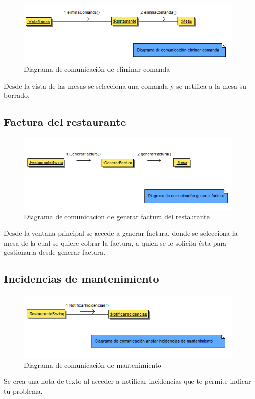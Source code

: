 \documentclass[spanish,a4paper,11pt, twoside]{report}	%
\begin{document}
		\begin{figure}[!h]
		\centering
		\includegraphics[scale=0.65]{DCeliminarcomanda.png}
		\caption{Diagrama de comunicación de eliminar comanda}
		\end{figure}
		Desde la vista de las mesas se selecciona una comanda y se notifica a la mesa su borrado.

		\subsection{Factura del restaurante}

		\begin{figure}[!h]
		\centering
		\includegraphics[scale=0.65]{DCfactura.png}
		\caption{Diagrama de comunicación de generar factura del restaurante }
		\end{figure}
		Desde la ventana principal se accede a generar factura, donde se selecciona la mesa de la cual se quiere cobrar 
		la factura, a quien se le solicita ésta para gestionarla desde generar factura.

		\subsection{Incidencias de mantenimiento}

		\begin{figure}[!h]
		\centering
		\includegraphics[scale=0.65]{DCanotarincidencias.png}
		\caption{Diagrama de comunicación de mantenimiento}
		\end{figure}
		Se  crea una nota de texto al acceder a notificar incidencias que te permite indicar tu problema.
\end{document}
